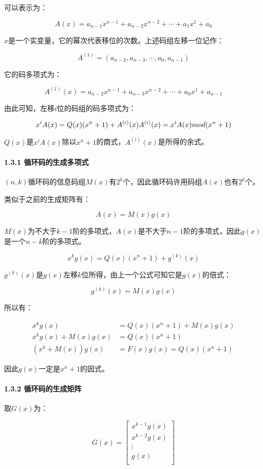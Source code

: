 \documentclass[
]{article}
\begin{document}
可以表示为：

$$A(x) = a_{n-1}x^{n-1}+a_{n-2}x^{n-2}+\cdots+a_{1}x^{1}+a_{0}$$

$x$是一个实变量，它的幂次代表移位的次数。上述码组左移一位记作：

$$A^{(1)} = (a_{n-2},a_{n-3},\cdots,a_{0},a_{n-1})$$

它的码多项式为：

$$A^{(1)}(x) = a_{n-2}x^{n-1}+a_{n-3}x^{n-2}+\cdots+a_{0}x^{1}+a_{n-1}$$

由此可知，左移$i$位的码组的码多项式为：

$$x^iA(x) = Q(x)(x^n+1)+A^{(i)}(x)\\
A^{(i)}(x) = x^iA(x) \space mod \space (x^n+1)$$

$Q(x)$是$x^iA(x)$除以$x^n+1$的商式，$A^{(i)}(x)$是所得的余式。

\hypertarget{header-n44}{%
\paragraph{1.3.1 循环码的生成多项式}\label{header-n44}}

$(n,k)$循环码的信息码组$M(x)$有$2^k$个，因此循环码许用码组$A(x)$也有$2^k$个。

类似于之前的生成矩阵有：

$$A(x)=M(x)g(x)$$

$M(x)$为不大于$k-1$阶的多项式，$A(x)$是不大于$n-1$阶的多项式，因此$g(x)$是一个$n-k$阶的多项式。

$$x^kg(x)=Q(x)(x^n+1)+g^{(k)}(x)$$

$g^{(k)}(x)$是$g(x)$左移$k$位所得，由上一个公式可知它是$g(x)$的倍式：

$$g^{(k)}(x)=M(x)g(x)$$

所以有：

\begin{align}
x^kg(x)&=Q(x)(x^n+1)+M(x)g(x)\\
x^kg(x)+M(x)g(x)&=Q(x)(x^n+1)\\
(x^k+M(x))g(x)&=F(x)g(x)=Q(x)(x^n+1)
\end{align}

因此$g(x)$一定是$x^n+1$的因式。

\hypertarget{header-n55}{%
\paragraph{1.3.2 循环码的生成矩阵}\label{header-n55}}

取$G(x)$为：

$$G(x)=
\left[
\begin{matrix}
x^{k-1}g(x)\\
x^{k-2}g(x)\\
 \vdots \\
g(x)\\
\end{matrix}
\right]$$
\end{document}
